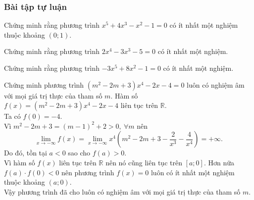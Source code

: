 \subsubsection{Bài tập tự luận}
\begin{bt}%
Chứng minh rằng phương trình $x^5+4x^3-x^2-1=0$ có ít nhất một nghiệm thuộc khoảng $(0;1)$.
\end{bt}
\begin{bt}%
		Chứng minh rằng phương trình $ 2x^4-3x^3-5=0 $ có ít nhất một nghiệm.
	\end{bt}
	\begin{bt}%
Chứng minh rằng phương trình $-3x^5+8x^2-1=0$ có ít nhất một nghiệm.
\end{bt}
\begin{bt}%
Chứng minh phương trình $\left(m^2-2m+3\right)x^4-2x-4=0$ luôn có nghiệm âm với mọi giá trị thực của tham số $m$.
\loigiai
{Hàm số $f(x)=\left(m^2-2m+3\right)x^4-2x-4$ liên tục trên $\mathbb{R}$.\\
Ta có $f(0)=-4$.\\
Vì $m^2-2m+3=(m-1)^2+2>0,\ \forall m$ nên $$\lim\limits_{x\to -\infty} f(x)=\lim\limits_{x\to -\infty} x^4\left(m^2-2m+3-\dfrac{2}{x^3}-\dfrac{4}{x^4}\right)=+\infty.$$
Do đó, tồn tại $a<0$ sao cho $f(a)>0$.\\
Vì hàm số $f(x)$ liên tục trên $\mathbb{R}$ nên nó cũng liên tục trên $[a; 0]$. Hơn nữa $f(a)\cdot f(0)<0$ nên phương trình $f(x)=0$ luôn có ít nhất một nghiệm thuộc khoảng $(a; 0)$.\\
Vậy phương trình đã cho luôn có nghiệm âm với mọi giá trị thực của tham số $m$.
}
\end{bt}

